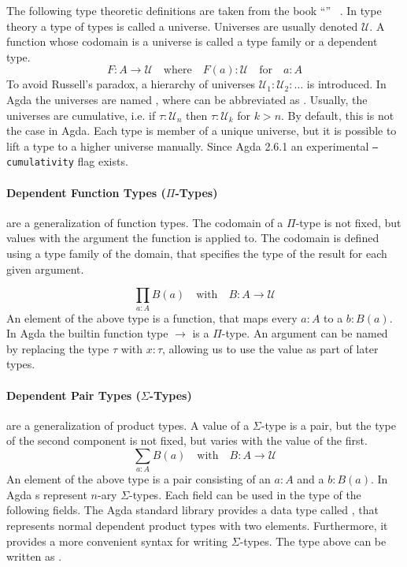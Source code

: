 The following type theoretic definitions are taken from the
book ``'' ~\cite{hottbook}.
In type theory a type of types is called a universe.
Universes are usually denoted $\mathcal{U}$.
A function whose codomain is a universe is called a type family or a dependent
type.
$$
F : A \rightarrow \mathcal{U} \quad\text{where}\quad F(a) : \mathcal{U}
\quad\text{for}\quad a : A
$$
To avoid Russell's paradox, a hierarchy of universes $\mathcal{U}_1 :
\mathcal{U}_2 : \dots$ is introduced.
In Agda the universes are named , where 
can be abbreviated as .
Usually, the universes are cumulative, i.e. if $\tau : \mathcal{U}_n$ then
$\tau : \mathcal{U}_k$ for $k>n$.
By default, this is not the case in Agda.
Each type is member of a unique universe, but it is possible to lift a type to a
higher universe manually.
Since Agda 2.6.1 an experimental \texttt{--cumulativity} flag exists.

\paragraph{Dependent Function Types ($\Pi$-Types)} are a generalization of
function types.
The codomain of a $\Pi$-type is not fixed, but values with the argument the
function is applied to.
The codomain is defined using a type family of the domain, that specifies the
type of the result for each given argument.

$$
\prod_{a : A} B(a) \quad \text{with}\quad B : A \rightarrow\mathcal{U}
$$
An element of the above type is a function, that maps every $a : A$ to a $b :
B(a)$.
In Agda the builtin function type $\rightarrow$ is a $\Pi$-type.
An argument can be named by replacing the type $\tau$ with $x : \tau$, allowing
us to use the value as part of later types.

\paragraph{Dependent Pair Types ($\Sigma$-Types)} are a generalization of product
types.
A value of a $\Sigma$-type is a pair, but the type of the second component is
not fixed, but varies with the value of the first.
$$
\sum_{a : A} B(a) \quad \text{with}\quad B : A \rightarrow\mathcal{U}
$$
An element of the above type is a pair consisting of an $a : A$ and a $b : B(a)$.
In Agda s represent $n$-ary $\Sigma$-types.
Each field can be used in the type of the following fields.
The Agda standard library provides a data type called , that
represents normal dependent product types with two elements.
Furthermore, it provides a more convenient syntax for writing $\Sigma$-types.
The type above can be written as .

